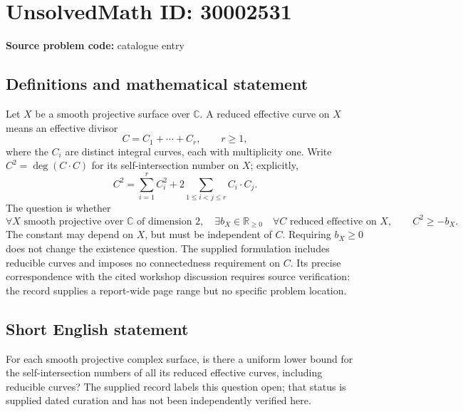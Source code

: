 \documentclass[11pt]{article}
\newcommand{\R}{\mathbb{R}}
\newcommand{\C}{\mathbb{C}}
\begin{document}
\section*{UnsolvedMath ID: 30002531}
\textbf{Source problem code:} catalogue entry
\subsection{Definitions and mathematical statement}
Let \(X\) be a smooth projective surface over \(\C\). A reduced effective curve on \(X\) means an effective divisor
\[
C=C_1+\cdots+C_r,\qquad r\geq 1,
\]
where the \(C_i\) are distinct integral curves, each with multiplicity one. Write \(C^2=\deg(C\cdot C)\) for its self-intersection number on \(X\); explicitly,
\[
C^2=\sum_{i=1}^r C_i^2+2\sum_{1\leq i<j\leq r}C_i\cdot C_j.
\]
The question is whether
\[
\forall X\text{ smooth projective over }\C\text{ of dimension }2,\quad
\exists b_X\in\R_{\geq 0}\quad
\forall C\text{ reduced effective on }X,\qquad
C^2\geq -b_X.
\]
The constant may depend on \(X\), but must be independent of \(C\). Requiring \(b_X\geq 0\) does not change the existence question. The supplied formulation includes reducible curves and imposes no connectedness requirement on \(C\). Its precise correspondence with the cited workshop discussion requires source verification: the record supplies a report-wide page range but no specific problem location.
\subsection{Short English statement}
For each smooth projective complex surface, is there a uniform lower bound for the self-intersection numbers of all its reduced effective curves, including reducible curves? The supplied record labels this question open; that status is supplied dated curation and has not been independently verified here.
\end{document}
